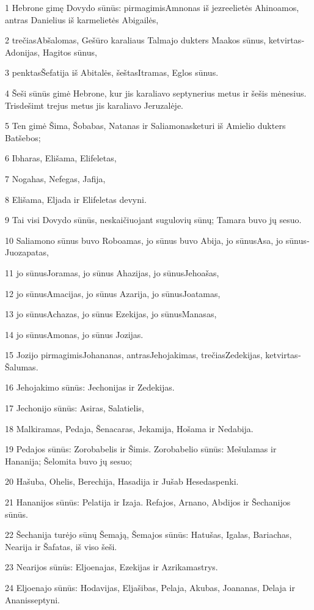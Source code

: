 \par 1 Hebrone gimę Dovydo sūnūs: pirmagimis­Amnonas iš jezreelietės Ahinoamos, antras­ Danielius iš karmelietės Abigailės, 
\par 2 trečias­Abšalomas, Gešūro karaliaus Talmajo dukters Maakos sūnus, ketvirtas­Adonijas, Hagitos sūnus, 
\par 3 penktas­Šefatija iš Abitalės, šeštas­Itramas, Eglos sūnus. 
\par 4 Šeši sūnūs gimė Hebrone, kur jis karaliavo septynerius metus ir šešis mėnesius. Trisdešimt trejus metus jis karaliavo Jeruzalėje. 
\par 5 Ten gimė Šima, Šobabas, Natanas ir Saliamonas­keturi iš Amielio dukters Batšebos; 
\par 6 Ibharas, Elišama, Elifeletas, 
\par 7 Nogahas, Nefegas, Jafija, 
\par 8 Elišama, Eljada ir Elifeletas­ devyni. 
\par 9 Tai visi Dovydo sūnūs, neskaičiuojant sugulovių sūnų; Tamara buvo jų sesuo. 
\par 10 Saliamono sūnus buvo Roboamas, jo sūnus buvo Abija, jo sūnus­Asa, jo sūnus­Juozapatas, 
\par 11 jo sūnus­Joramas, jo sūnus­ Ahazijas, jo sūnus­Jehoašas, 
\par 12 jo sūnus­Amacijas, jo sūnus­ Azarija, jo sūnus­Joatamas, 
\par 13 jo sūnus­Achazas, jo sūnus­ Ezekijas, jo sūnus­Manasas, 
\par 14 jo sūnus­Amonas, jo sūnus­ Jozijas. 
\par 15 Jozijo pirmagimis­Johananas, antras­Jehojakimas, trečias­Zedekijas, ketvirtas­Šalumas. 
\par 16 Jehojakimo sūnūs: Jechonijas ir Zedekijas. 
\par 17 Jechonijo sūnūs: Asiras, Salatielis, 
\par 18 Malkiramas, Pedaja, Šenacaras, Jekamija, Hošama ir Nedabija. 
\par 19 Pedajos sūnūs: Zorobabelis ir Šimis. Zorobabelio sūnūs: Mešulamas ir Hananija; Šelomita buvo jų sesuo; 
\par 20 Hašuba, Ohelis, Berechija, Hasadija ir Jušab Hesedas­penki. 
\par 21 Hananijos sūnūs: Pelatija ir Izaja. Refajos, Arnano, Abdijos ir Šechanijos sūnūs. 
\par 22 Šechanija turėjo sūnų Šemają, Šemajos sūnūs: Hatušas, Igalas, Bariachas, Nearija ir Šafatas, iš viso šeši. 
\par 23 Nearijos sūnūs: Eljoenajas, Ezekijas ir Azrikamas­trys. 
\par 24 Eljoenajo sūnūs: Hodavijas, Eljašibas, Pelaja, Akubas, Joananas, Delaja ir Ananis­septyni.




